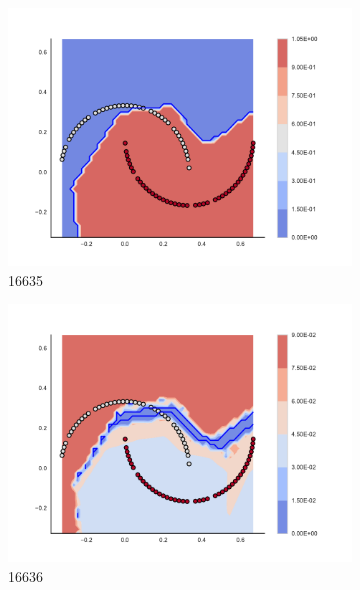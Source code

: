 \begin{figure}[h]
\begin{subfigure}[b]{0.09\textwidth}
    \includegraphics[clip, trim=2.35cm 1.75cm 4.5cm 0cm,width=\textwidth]{img/convergence/16635.pdf}
    \caption{16635}
    \label{fig:convergence_16635}
\end{subfigure}
%
\begin{subfigure}[b]{0.09\textwidth}
    \includegraphics[clip, trim=2.35cm 1.75cm 4.5cm 0cm,width=\textwidth]{img/convergence/16636.pdf}
    \caption{16636}
    \label{fig:convergence_16636}
\end{subfigure}
%
\begin{subfigure}[b]{0.09\textwidth}

\end{subfigure}
\end{figure}
